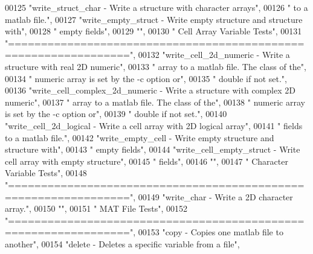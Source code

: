 \begin{DoxyCode}
00125 \textcolor{stringliteral}{"write\_struct\_char               - Write a structure with character arrays"},
00126 \textcolor{stringliteral}{"                                  to a matlab file."},
00127 \textcolor{stringliteral}{"write\_empty\_struct              - Write empty structure and structure with"},
00128 \textcolor{stringliteral}{"                                  empty fields"},
00129 \textcolor{stringliteral}{""},
00130 \textcolor{stringliteral}{"    Cell Array Variable Tests"},
00131 \textcolor{stringliteral}{"================================================================"},
00132 \textcolor{stringliteral}{"write\_cell\_2d\_numeric         - Write a structure with real 2D numeric"},
00133 \textcolor{stringliteral}{"                                array to a matlab file. The class of the"},
00134 \textcolor{stringliteral}{"                                numeric array is set by the -c option or"},
00135 \textcolor{stringliteral}{"                                double if not set."},
00136 \textcolor{stringliteral}{"write\_cell\_complex\_2d\_numeric - Write a structure with complex 2D numeric"},
00137 \textcolor{stringliteral}{"                                array to a matlab file. The class of the"},
00138 \textcolor{stringliteral}{"                                numeric array is set by the -c option or"},
00139 \textcolor{stringliteral}{"                                double if not set."},
00140 \textcolor{stringliteral}{"write\_cell\_2d\_logical         - Write a cell array with 2D logical array"},
00141 \textcolor{stringliteral}{"                                fields to a matlab file."},
00142 \textcolor{stringliteral}{"write\_empty\_cell              - Write empty structure and structure with"},
00143 \textcolor{stringliteral}{"                                empty fields"},
00144 \textcolor{stringliteral}{"write\_cell\_empty\_struct       - Write cell array with empty structure"},
00145 \textcolor{stringliteral}{"                                fields"},
00146 \textcolor{stringliteral}{""},
00147 \textcolor{stringliteral}{"    Character Variable Tests"},
00148 \textcolor{stringliteral}{"================================================================"},
00149 \textcolor{stringliteral}{"write\_char               - Write a 2D character array."},
00150 \textcolor{stringliteral}{""},
00151 \textcolor{stringliteral}{"    MAT File Tests"},
00152 \textcolor{stringliteral}{"================================================================"},
00153 \textcolor{stringliteral}{"copy                    - Copies one matlab file to another"},
00154 \textcolor{stringliteral}{"delete                  - Deletes a specific variable from a file"},

\end{DoxyCode}
